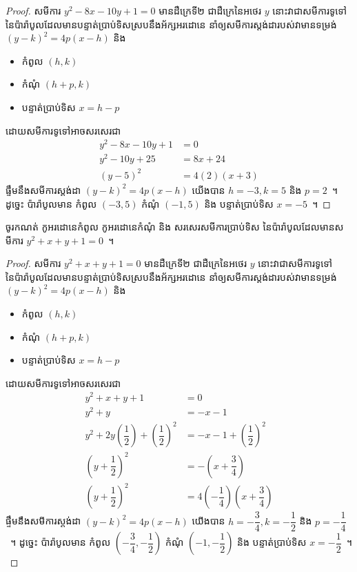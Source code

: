 \begin{proof}
	សមីការ $ y^2-8x-10y+1=0 $ មានដឺក្រេទី២ ជាដឺក្រេនៃអថេរ $ y $ នោះវាជាសមីការទូទៅនៃប៉ារ៉ាបូលដែលមានបន្ទាត់ប្រាប់ទិសស្របនឹងអ័ក្សអរដោនេ នាំឲ្យសមីការស្តង់ដារបស់វាមានទម្រង់ $ (y-k)^2=4p(x-h) $ និង
	\begin{itemize}
		\item កំពូល $ (h,k) $
		\item កំណុំ $ (h+p,k) $
		\item បន្ទាត់ប្រាប់ទិស $ x=h-p $
	\end{itemize}
	ដោយសមីការទូទៅអាចសរសេរជា
	\begin{align*}
	y^2-8x-10y+1 &=0\\
	y^2-10y+25 &=8x+24\\
	(y-5)^2 &=4(2)(x+3)
	\end{align*}
	ផ្ទឹមនឹងសមីការស្តង់ដា $ (y-k)^2=4p(x-h) $ យើងបាន $ h=-3,k=5 $ និង $ p=2 $~។ ដូច្នេះ ប៉ារ៉ាបូលមាន​ កំពូល $ (-3,5) $ កំណុំ $ (-1,5) $ និង បន្ទាត់ប្រាប់ទិស $ x=-5 $~។
\end{proof}
%
\begin{example}
	ចូរកណត់ កូអរដោនេ​កំពូល កូអរដោនេ​កំណុំ និង សរសេរសមីការប្រាប់ទិស នៃប៉ារ៉ាបូលដែលមានសមីការ $ y^2+x+y+1=0 $~។
\end{example}
%
\begin{proof}
	សមីការ $ y^2+x+y+1=0 $ មានដឺក្រេទី២ ជាដឺក្រេនៃអថេរ $ y $ នោះវាជាសមីការទូទៅនៃប៉ារ៉ាបូលដែលមានបន្ទាត់ប្រាប់ទិសស្របនឹងអ័ក្សអរដោនេ នាំឲ្យសមីការស្តង់ដារបស់វាមានទម្រង់ $ (y-k)^2=4p(x-h) $ និង
	\begin{itemize}
		\item កំពូល $ (h,k) $
		\item កំណុំ $ (h+p,k) $
		\item បន្ទាត់ប្រាប់ទិស $ x=h-p $
	\end{itemize}
	ដោយសមីការទូទៅអាចសរសេរជា
	\begin{align*}
	y^2+x+y+1 &=0\\
	y^2+y &=-x-1\\
	y^2+2y\left(\dfrac{1}{2}\right)+\left(\dfrac{1}{2}\right)^2 &=-x-1+\left(\dfrac{1}{2}\right)^2\\
	\left(y+\dfrac{1}{2}\right)^2 &=-\left(x+\dfrac{3}{4}\right)\\
	\left(y+\dfrac{1}{2}\right)^2 &=4\left(-\dfrac{1}{4}\right)\left(x+\dfrac{3}{4}\right)
	\end{align*}
	ផ្ទឹមនឹងសមីការស្តង់ដា $ (y-k)^2=4p(x-h) $ យើងបាន $ h=-\dfrac{3}{4},k=-\dfrac{1}{2} $ និង $ p=-\dfrac{1}{4} $~។ ដូច្នេះ ប៉ារ៉ាបូលមាន​ កំពូល $ \left(-\dfrac{3}{4},-\dfrac{1}{2}\right) $ កំណុំ $ \left(-1,-\dfrac{1}{2}\right) $ និង បន្ទាត់ប្រាប់ទិស $ x=-\dfrac{1}{2} $~។
\end{proof}
%
